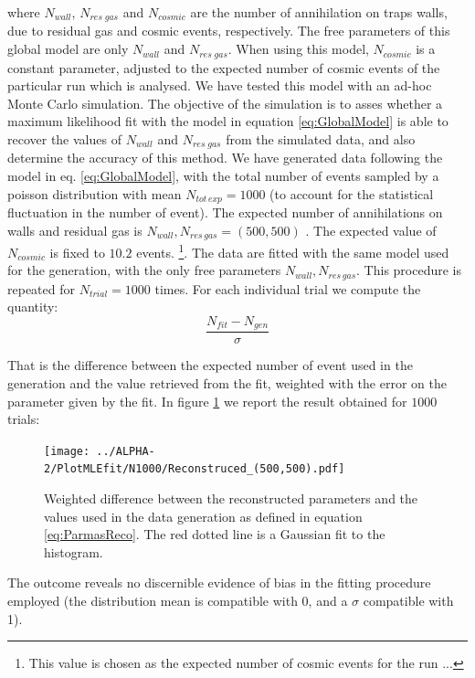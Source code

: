 \documentclass[11pt,a4paper,oneside]{article}
\begin{document}
where $N_{wall}$, $N_ {res \; gas}$ and $N_{cosmic}$ are the number of annihilation on traps walls, due to residual gas and cosmic events, respectively.
The free parameters of this global model are only $N_{wall}$ and $N_{res \; gas}$. When using this model, $N_{cosmic}$ is a constant parameter, adjusted to the expected number of cosmic events of the particular run which is analysed.
We have tested this model with an ad-hoc Monte Carlo simulation. The objective of the simulation is to asses whether a maximum likelihood fit with the model in equation \ref{eq:GlobalModel} is able to recover the values of $N_{wall}$ and $N_{res \; gas}$ from the simulated data, and also determine the accuracy of this method. 
We have generated data following the model in eq. \ref{eq:GlobalModel}, with the total number of events sampled by a poisson distribution with mean $N_{tot \, exp} = 1000$ (to account for the statistical fluctuation in the number of event). The expected number of annihilations on walls and residual gas is $N_{wall} , N_{res \, gas} = (500,500)$ . The expected value of $N_{cosmic}$ is fixed to $10.2$ events. \footnote{ This value is chosen as the expected number of cosmic events for the run ...}.
The data are fitted with the same model used for the generation, with the only free parameters $N_{wall} , N_{res \, gas}$. This procedure is repeated for $N_{trial} = 1000$ times. For each individual trial we compute the quantity:
\begin{equation} \label{eq:ParmasReco}
\dfrac{N_{fit} - N_{gen}}{\sigma}
\end{equation}

That is the difference between the expected number of event used in the generation and the value retrieved from the fit, weighted with the error on the parameter given by the fit. In figure \ref{fig:ReconstructedParameters} we report the result obtained for $1000$ trials: 

\begin{figure}[hbtp]
\centering
\texttt{[image: ../ALPHA-2/PlotMLEfit/N1000/Reconstruced\_(500,500).pdf]}
\caption{Weighted difference between the reconstructed parameters and the values used in the data generation as defined in equation \ref{eq:ParmasReco}. The red dotted line is a Gaussian fit to the histogram.}
\label{fig:ReconstructedParameters}
\end{figure}

The outcome reveals no discernible evidence of bias in the fitting procedure employed (the distribution mean is compatible with $0$, and a $\sigma$  compatible with 1).
\end{document}
